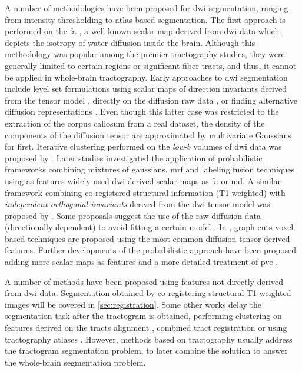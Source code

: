 A number of methodologies have been proposed for \gls{dwi} segmentation, ranging 
from intensity thresholding to atlas-based segmentation. The first approach is performed 
on the \gls{fa} \citep{ennis_orthogonal_2006}, a well-known scalar map derived from
\gls{dwi} data which depicts the isotropy of water diffusion inside the brain.
Although this methodology was popular among the premier tractography studies,
they were generally limited to certain regions or significant fiber tracts, and thus,
it cannot be applied in whole-brain tractography. Early approaches to \gls{dwi} segmentation 
include level set formulations using scalar maps of direction invariants derived
from the tensor model \citep{zhukov_level_2003}, directly on the diffusion raw data
\citep{rousson_level_2004}, or finding alternative diffusion representations 
\citep{jonasson_representing_2007}. Even though this latter case was restricted to the extraction of
the corpus callosum from a real dataset, the density of the components of the diffusion tensor
are approximated by multivariate Gaussians for first. Iterative clustering performed on the 
\emph{low}-$b$ volumes of \gls{dwi} data was proposed by \citep{hadjiprocopis_unbiased_2005}.
Later studies investigated the application of probabilistic frameworks combining mixtures of 
gaussians, \gls{mrf} and labeling fusion techniques \citep{liu_brain_2007} using as features 
widely-used \gls{dwi}-derived scalar maps as \gls{fa} or \gls{md}. A similar framework 
combining co-registered structural information (T1 weighted) with \emph{independent orthogonal 
invariants} derived from the \gls{dwi} tensor model was proposed by \citep{awate_multivariate_2008}. 
Some proposals suggest the use of the raw diffusion data (directionally dependent) to avoid fitting 
a certain model \citep{lu_segmentation_2008}. In \citep{han_experimental_2009}, graph-cuts 
voxel-based techniques are proposed using the most common diffusion tensor derived features.
Further developments of the probabilistic approach have been proposed adding more scalar maps
as features and a more detailed treatment of \gls{pve} \citep{kumazawa_partial_2010}.

A number of methods have been proposed using features not directly derived from \gls{dwi} data.
Segmentation obtained by co-registering structural T1-weighted images will be covered in 
\autoref{sec:registration}. Some other works delay the segmentation task after the tractogram 
is obtained, performing clustering on features derived on the tracts alignment 
\citep{jonasson_white_2005}, combined tract registration \citep{mayer_supervised_2011} or using
tractography atlases \citep{odonnell_automatic_2007}. However, methods based on tractography
usually address the tractogram segmentation problem, to later combine the solution to 
answer the whole-brain segmentation problem.

